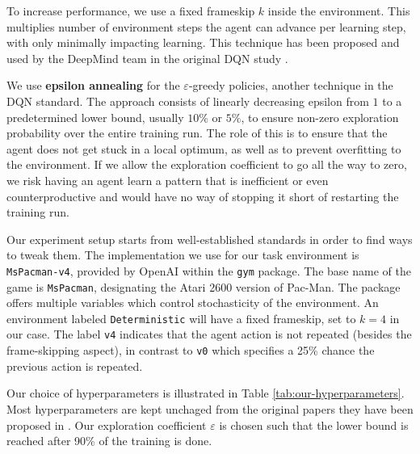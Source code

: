 To increase performance, we use a fixed frameskip $k$ inside the environment.
This multiplies number of environment steps the agent can advance per learning step, with only minimally impacting learning.
This technique\footnotemark{} has been proposed and used by the DeepMind team in the original DQN study \cite{atari-dqn}.

We use \textbf{epsilon annealing} for the $\varepsilon$-greedy policies, another technique in the DQN standard.
The approach consists of linearly decreasing epsilon from $1$ to a predetermined lower bound, usually $10\%$ or $5\%$, to ensure non-zero exploration probability over the entire training run.
The role of this is to ensure that the agent does not get stuck in a local optimum, as well as to prevent overfitting to the environment.
If we allow the exploration coefficient to go all the way to zero, we risk having an agent learn a pattern that is inefficient or even counterproductive and would have no way of stopping it short of restarting the training run.

Our experiment setup starts from well-established standards in order to find ways to tweak them.
The implementation we use for our task environment is \texttt{MsPacman-v4}, provided by OpenAI within the \texttt{gym} package.
The base name of the game is \texttt{MsPacman}, designating the Atari 2600 version of Pac-Man.
The package offers multiple variables which control stochasticity of the environment.
An environment labeled \texttt{Deterministic} will have a fixed frameskip, set to $k = 4$ in our case.
The label \texttt{v4} indicates that the agent action is not repeated (besides the frame-skipping aspect), in contrast to \texttt{v0} which specifies a 25\% chance the previous action is repeated.

Our choice of hyperparameters is illustrated in Table \ref{tab:our-hyperparameters}.
Most hyperparameters are kept unchaged from the original papers they have been proposed in \cite{atari-dqn, per-paper}.
Our exploration coefficient $\varepsilon$ is chosen such that the lower bound is reached after 90\% of the training is done.

